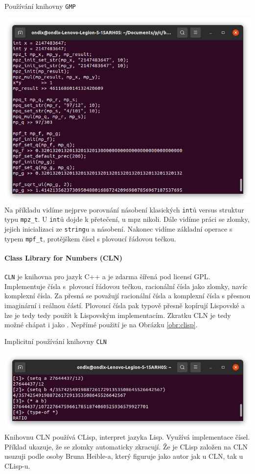 \begin{myfigure}{}
\caption{Používání knihovny \texttt{GMP}}
\includegraphics[width=\linewidth]{./graphics/gmp.png}\label{obr:gmp}
Na příkladu vidíme nejprve porovnání násobení klasických \texttt{int}ů versus struktur typu \texttt{mpz\_t}. U \texttt{int}ů dojde k přetečení, u mpz nikoli. Dále vidíme práci se zlomky, jejich inicializaci ze \texttt{string}u a násobení. Nakonec vidíme základní operace s typem \texttt{mpf\_t}, protějškem čísel s plovoucí řádovou tečkou.
\end{myfigure}

\paragraph{Class Library for Numbers \cite{wiki:CLN} (CLN)} \texttt{CLN} je knihovna pro jazyk C++ a je zdarma šířená pod licensí GPL. Implementuje čísla s~plovoucí řádovou tečkou, racionální čísla jako zlomky, navíc komplexní čísla. Za přesná se považují racionální čísla a komplexní čísla s přesnou imaginární i reálnou částí. Plovoucí čísla pak typově přesně kopírují Lispovské a lze je tedy tedy použít k Lispovským implementacím. Zkratku CLN je tedy možné chápat i jako . Nepřímé použití je na Obrázku \ref{obr:clisp}.
	
\begin{myfigure}{}
\caption{Implicitní používání knihovny \texttt{CLN}}
\includegraphics[width=\linewidth]{./graphics/clisp.png}\label{obr:clisp}
Knihovnu CLN používá CLisp, interpret jazyka Lisp. Využívá implementace čísel. Příklad ukazuje, že se zlomky automaticky zkracují. Že je CLisp založen na CLN usuzuji podle osoby Bruna Heible-a, který figuruje jako autor jak u CLN, tak u CLisp-u.
\end{myfigure}

